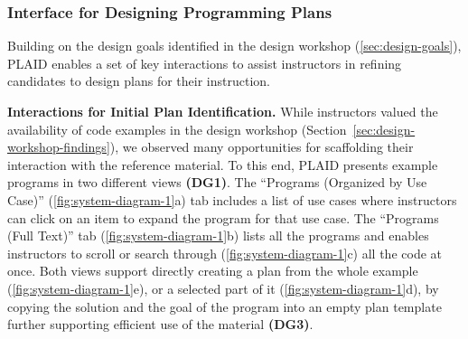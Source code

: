 \subsubsection{Interface for Designing Programming Plans}
Building on the 
design goals identified in the design workshop (\cref{sec:design-goals}), PLAID enables a set of key interactions to assist instructors in refining candidates to design plans for their instruction. 



\textbf{Interactions for Initial Plan Identification.}
While instructors valued the availability of code examples in the design workshop (Section~\ref{sec:design-workshop-findings}), we observed many opportunities for scaffolding their interaction with the reference material. To this end, PLAID presents example programs in two different views \textbf{(DG1)}. 
The ``Programs (Organized by Use Case)'' (\cref{fig:system-diagram-1}a) tab includes a list of use cases where instructors can click on an item to expand the program for that use case.
The ``Programs (Full Text)''  tab (\cref{fig:system-diagram-1}b) lists all the programs and enables instructors to scroll or search through (\cref{fig:system-diagram-1}c) all the code at once.
Both views support directly creating a plan from the whole example (\cref{fig:system-diagram-1}e), or a selected part of it (\cref{fig:system-diagram-1}d), by copying the solution and the goal of the program into an empty plan template
further supporting efficient use of the material \textbf{(DG3)}.

